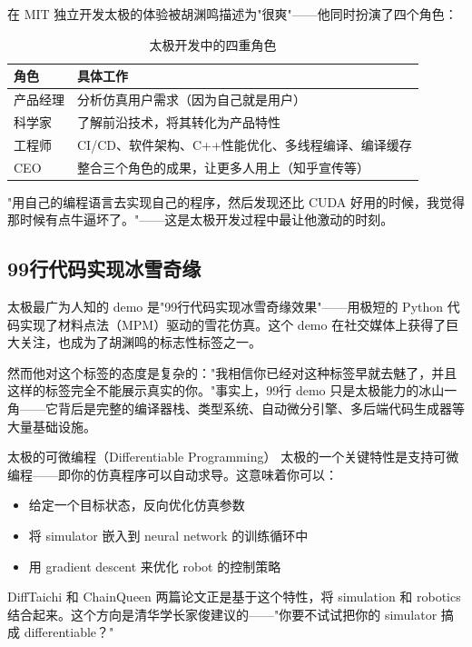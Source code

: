 在 MIT 独立开发太极的体验被胡渊鸣描述为"很爽"——他同时扮演了四个角色：

\begin{table}[H]
\centering
\caption{太极开发中的四重角色}
\begin{tabular}{ll}
\toprule
\textbf{角色} & \textbf{具体工作} \\
\midrule
产品经理 & 分析仿真用户需求（因为自己就是用户） \\
科学家 & 了解前沿技术，将其转化为产品特性 \\
工程师 & CI/CD、软件架构、C++性能优化、多线程编译、编译缓存 \\
CEO & 整合三个角色的成果，让更多人用上（知乎宣传等） \\
\bottomrule
\end{tabular}
\end{table}

"用自己的编程语言去实现自己的程序，然后发现还比 CUDA 好用的时候，我觉得那时候有点牛逼坏了。"——这是太极开发过程中最让他激动的时刻。

\subsection{99行代码实现冰雪奇缘}

太极最广为人知的 demo 是"99行代码实现冰雪奇缘效果"——用极短的 Python 代码实现了材料点法（MPM）驱动的雪花仿真。这个 demo 在社交媒体上获得了巨大关注，也成为了胡渊鸣的标志性标签之一。

然而他对这个标签的态度是复杂的："我相信你已经对这种标签早就去魅了，并且这样的标签完全不能展示真实的你。"事实上，99行 demo 只是太极能力的冰山一角——它背后是完整的编译器栈、类型系统、自动微分引擎、多后端代码生成器等大量基础设施。

\begin{knowledgebox}{太极的可微编程（Differentiable Programming）}
太极的一个关键特性是支持可微编程——即你的仿真程序可以自动求导。这意味着你可以：
\begin{itemize}
\item 给定一个目标状态，反向优化仿真参数
\item 将 simulator 嵌入到 neural network 的训练循环中
\item 用 gradient descent 来优化 robot 的控制策略
\end{itemize}
DiffTaichi 和 ChainQueen 两篇论文正是基于这个特性，将 simulation 和 robotics 结合起来。这个方向是清华学长家俊建议的——"你要不试试把你的 simulator 搞成 differentiable？"
\end{knowledgebox}

